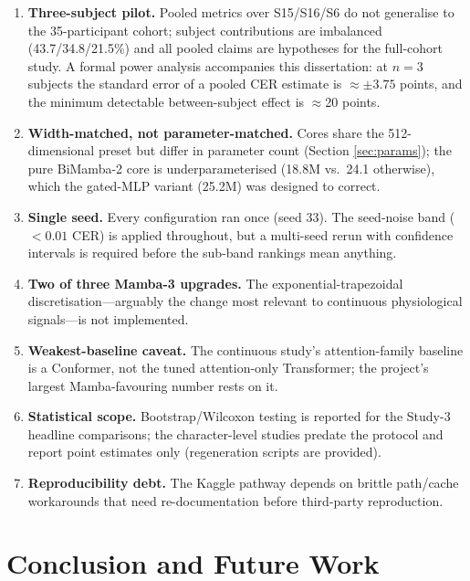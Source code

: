 \documentclass[11pt,a4paper]{report}
\begin{document}
\begin{enumerate}
  \item \textbf{Three-subject pilot.} Pooled metrics over S15/S16/S6 do not
  generalise to the 35-participant cohort; subject contributions are
  imbalanced (43.7/34.8/21.5\%) and all pooled claims are hypotheses for the
  full-cohort study. A formal power analysis accompanies this dissertation:
  at $n=3$ subjects the standard error of a pooled CER estimate is
  $\approx\pm3.75$ points, and the minimum detectable between-subject effect
  is $\approx$20 points.
  \item \textbf{Width-matched, not parameter-matched.} Cores share the
  512-dimensional preset but differ in parameter count (Section
  \ref{sec:params}); the pure BiMamba-2 core is underparameterised (18.8M
  vs.\ 24.1 otherwise), which the gated-MLP variant (25.2M) was designed to
  correct.
  \item \textbf{Single seed.} Every configuration ran once (seed 33). The
  seed-noise band ($<0.01$ CER) is applied throughout, but a multi-seed
  rerun with confidence intervals is required before the sub-band rankings
  mean anything.
  \item \textbf{Two of three Mamba-3 upgrades.} The exponential-trapezoidal
  discretisation---arguably the change most relevant to continuous
  physiological signals---is not implemented.
  \item \textbf{Weakest-baseline caveat.} The continuous study's
  attention-family baseline is a Conformer, not the tuned attention-only
  Transformer; the project's largest Mamba-favouring number rests on it.
  \item \textbf{Statistical scope.} Bootstrap/Wilcoxon testing is reported
  for the Study-3 headline comparisons; the character-level studies predate
  the protocol and report point estimates only (regeneration scripts are
  provided).
  \item \textbf{Reproducibility debt.} The Kaggle pathway depends on brittle
  path/cache workarounds that need re-documentation before third-party
  reproduction.
\end{enumerate}

\chapter{Conclusion and Future Work}
\label{ch:conclusion}
\end{document}
